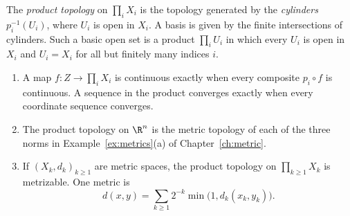 \begin{definition}
The \emph{product topology} on $\prod_i X_i$ is the topology generated by the \emph{cylinders} $p_i^{-1}(U_i)$, where $U_i$ is open in $X_i$. A basis is given by the finite intersections of cylinders. Such a basic open set is a product $\prod_i U_i$ in which every $U_i$ is open in $X_i$ and $U_i=X_i$ for all but finitely many indices $i$.
\end{definition}

\begin{proposition}\label{prop:product}
\begin{enumerate}[label=(\alph*)]
\item A map $f:Z\to\prod_i X_i$ is continuous exactly when every composite $p_i\circ f$ is continuous. A sequence in the product converges exactly when every coordinate sequence converges.
\item The product topology on $\R^n$ is the metric topology of each of the three norms in Example~\ref{ex:metrics}(a) of Chapter~\ref{ch:metric}.
\item If $(X_k,d_k)_{k\ge1}$ are metric spaces, the product topology on $\prod_{k\ge1} X_k$ is metrizable. One metric is
\[d(x,y)=\sum_{k\ge1}2^{-k}\min\bigl(1,d_k(x_k,y_k)\bigr).\]
\end{enumerate}
\end{proposition}
